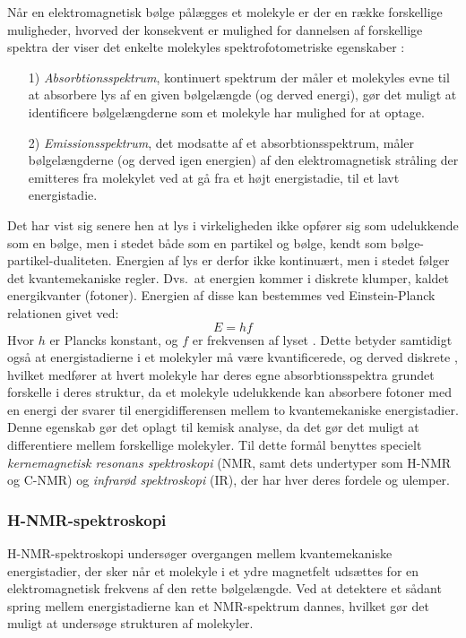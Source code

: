     Når en elektromagnetisk bølge pålægges et molekyle er der en række forskellige muligheder, hvorved der konsekvent er mulighed for dannelsen af forskellige spektra der viser det enkelte molekyles spektrofotometriske egenskaber \parencite{Finn2020}:
    \begin{itemize}
        \item[1)] \textit{Absorbtionsspektrum}, kontinuert spektrum der måler et molekyles evne til at absorbere lys af en given bølgelængde (og derved energi), gør det muligt at identificere bølgelængderne som et molekyle har mulighed for at optage.
        \item[2)] \textit{Emissionsspektrum}, det modsatte af et absorbtionsspektrum, måler bølgelængderne (og derved igen energien) af den elektromagnetisk stråling der emitteres fra molekylet ved at gå fra et højt energistadie, til et lavt energistadie.
    \end{itemize}
    Det har vist sig senere hen at lys i virkeligheden ikke opfører sig som udelukkende som en bølge, men i stedet både som en partikel og bølge, kendt som bølge-partikel-dualiteten. Energien af lys er derfor ikke kontinuært, men i stedet følger det kvantemekaniske regler. Dvs.\ at energien kommer i diskrete klumper, kaldet energikvanter (fotoner). Energien af disse kan bestemmes ved Einstein-Planck relationen givet ved:
    \[
    E=hf
    \]
    Hvor $h$ er Plancks konstant, og $f$ er frekvensen af lyset \parencite{Giov2022}. Dette betyder samtidigt også at energistadierne i et molekyler må være kvantificerede, og derved diskrete \parencite{Erla2002}, hvilket medfører at hvert molekyle har deres egne absorbtionsspektra grundet forskelle i deres struktur, da et molekyle udelukkende kan absorbere fotoner med en energi der svarer til energidifferensen mellem to kvantemekaniske energistadier. Denne egenskab gør det oplagt til kemisk analyse, da det gør det muligt at differentiere mellem forskellige molekyler. Til dette formål benyttes specielt \textit{kernemagnetisk resonans spektroskopi} (NMR, samt dets undertyper som H-NMR og C-NMR) og \textit{infrarød spektroskopi} (IR), der har hver deres fordele og ulemper. 

    \subsubsection{H-NMR-spektroskopi}
    H-NMR-spektroskopi undersøger overgangen mellem kvantemekaniske energistadier, der sker når et molekyle i et ydre magnetfelt udsættes for en elektromagnetisk frekvens af den rette bølgelængde. Ved at detektere et sådant spring mellem energistadierne kan et NMR-spektrum dannes, hvilket gør det muligt at undersøge strukturen af molekyler.

